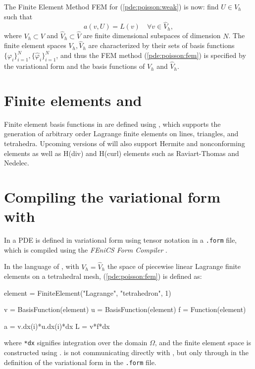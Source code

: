 The Finite Element Method FEM for (\ref{pde:poisson:weak}) is now: 
find $U\in V_h$ such that  
\begin{equation}\label{pde:poisson:fem}
a(v,U)=L(v) \quad \forall v\in \hat V_h, 
\end{equation}
where $V_h\subset V$ and $\hat V_h\subset \hat V$ are finite dimensional 
subspaces of dimension $N$. 
The finite element spaces $V_h,\hat V_h$ are characterized by their sets of basis 
functions $\{\varphi_i\}_{i=1}^N,\{\hat \varphi_i\}_{i=1}^N$, 
and thus the FEM method (\ref{pde:poisson:fem}) is specified by the 
variational form and the basis functions of $V_h$ and $\hat V_h$. 

\section{Finite elements and \fiat{}}

Finite element basis functions in \dolfin{} are defined using \fiat{}, 
which supports the generation of arbitrary order Lagrange finite 
elements on lines, triangles, and tetrahedra. 
Upcoming versions of \fiat{} will also support Hermite and nonconforming 
elements as well as H(div) and H(curl) elements such as Raviart-Thomas and Nedelec.

\section{Compiling the variational form with \ffc{}}

In \dolfin{} a PDE is defined in variational form using tensor notation 
in a \texttt{.form} file, which is compiled using the {\em FEniCS Form Compiler} \ffc{}. 

In the language of \ffc{}, with $V_h=\hat V_h$ the space of piecewise linear Lagrange 
finite elements on a tetrahedral mesh, (\ref{pde:poisson:fem}) is defined as:  
\begin{code}
element = FiniteElement("Lagrange", "tetrahedron", 1)

v = BasisFunction(element)
u = BasisFunction(element)
f = Function(element)

a = v.dx(i)*u.dx(i)*dx
L = v*f*dx
\end{code}
where \texttt{*dx} signifies integration over the domain $\Omega$, and 
the finite element space is constructed using \fiat{}. 
\dolfin{} is not communicating directly with \fiat{}, but only through 
\ffc{} in the definition of the variational form in the \texttt{.form} file.  


